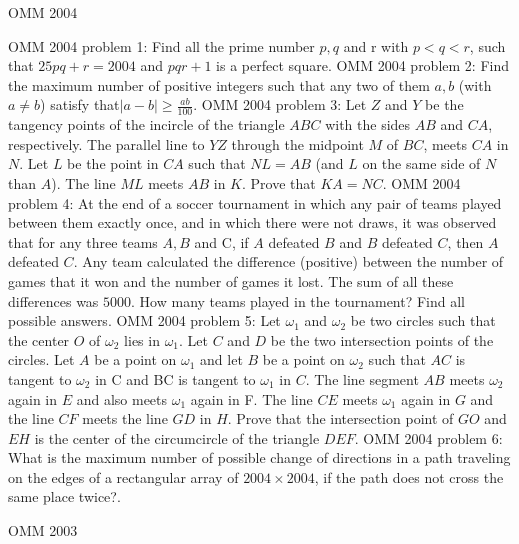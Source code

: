 OMM 2004 

OMM 2004 problem 1:  Find all the prime number $p, q$ and r with $p < q < r$, such that $25pq + r = 2004$ and $pqr + 1 $ is a perfect square. 
OMM 2004 problem 2:  Find the maximum number of positive integers such that any two of them $a, b$ (with $a \ne b$) satisfy that$ |a - b| \ge \frac{ab}{100} .$ 
OMM 2004 problem 3:  Let $Z$ and $Y$ be the tangency points of the incircle of the triangle $ABC$ with the sides $AB$ and $CA$, respectively. The parallel line to $Y Z$ through the midpoint $M$ of $BC$, meets $CA$ in $N$. Let $L$ be the point in $CA$ such that $NL = AB$ (and $L$ on the same side of $N$ than $A$). The line $ML$ meets $AB$ in $K$. Prove that $KA = NC$. 
OMM 2004 problem 4:  At the end of a soccer tournament in which any pair of teams played between them exactly once, and in which there were not draws, it was observed that for any three teams $A, B$ and C, if $A$ defeated $B$ and $B$ defeated $C$, then $A$ defeated $C$. Any team calculated the difference (positive) between the number of games that it won and the number of games it lost. The sum of all these differences was $5000$. How many teams played in the tournament? Find all possible answers. 
OMM 2004 problem 5:  Let $\omega_1$ and $\omega_2$ be two circles such that the center $O$ of $\omega_2$ lies in $\omega_1$. Let $C$ and $D$ be the two intersection points of the circles. Let $A$ be a point on $\omega_1$ and let $B$ be a point on $\omega_2$ such that $AC$ is tangent to $\omega_2$ in C and BC is tangent to $\omega_1$ in $C$. The line segment $AB$ meets $\omega_2$ again in $E$ and also meets $\omega_1$ again in F. The line $CE$ meets $\omega_1$ again in $G$ and the line $CF$ meets the line $GD$ in $H$. Prove that the intersection point of $GO$ and $EH$ is the center of the circumcircle of the triangle $DEF$. 
OMM 2004 problem 6:  What is the maximum number of possible change of directions in a path traveling on the edges of a rectangular array of $2004 \times 2004$, if the path does not cross the same place twice?. 

OMM 2003 

